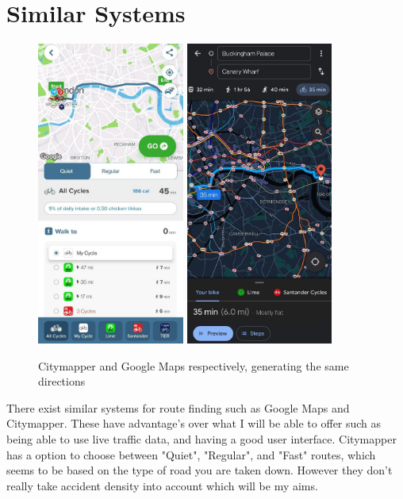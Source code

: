 \documentclass[11pt,twoside,a4paper]{report}
\begin{document}
\section{Similar Systems}
\begin{figure}[h]
    \begin{center}
        \includegraphics[height=10cm]{citymapper.png}
    \includegraphics[height=10cm]{googlemaps.png}
\end{center}
    \caption{Citymapper and Google Maps respectively, generating the same directions}
    \label{alternatives}
\end{figure}
There exist similar systems for route finding such as Google Maps and Citymapper. These have advantage's over what I will be able to offer such as being able to use live traffic data, and having a good user interface. Citymapper has a option to choose between "Quiet", "Regular", and "Fast" routes, which seems to be based on the type of road you are taken down.
However they don't really take accident density into account which will be my aims.
\end{document}
